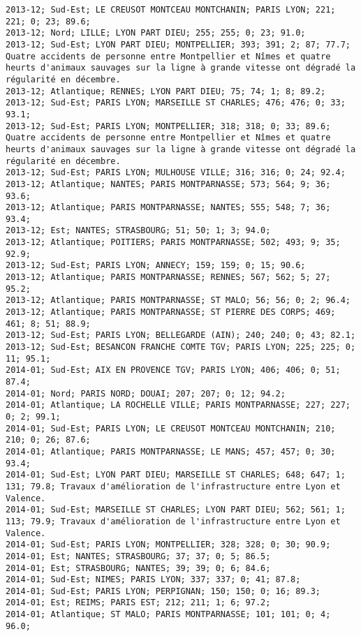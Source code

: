 \documentclass{article}
\begin{document}
\begin{Verbatim}[commandchars=\\\{\}]
2013-12; Sud-Est; LE CREUSOT MONTCEAU MONTCHANIN; PARIS LYON; 221; 221; 0; 23; 89.6; 
2013-12; Nord; LILLE; LYON PART DIEU; 255; 255; 0; 23; 91.0; 
2013-12; Sud-Est; LYON PART DIEU; MONTPELLIER; 393; 391; 2; 87; 77.7; Quatre accidents de personne entre Montpellier et Nîmes et quatre heurts d'animaux sauvages sur la ligne à grande vitesse ont dégradé la régularité en décembre.
2013-12; Atlantique; RENNES; LYON PART DIEU; 75; 74; 1; 8; 89.2; 
2013-12; Sud-Est; PARIS LYON; MARSEILLE ST CHARLES; 476; 476; 0; 33; 93.1; 
2013-12; Sud-Est; PARIS LYON; MONTPELLIER; 318; 318; 0; 33; 89.6; Quatre accidents de personne entre Montpellier et Nîmes et quatre heurts d'animaux sauvages sur la ligne à grande vitesse ont dégradé la régularité en décembre.
2013-12; Sud-Est; PARIS LYON; MULHOUSE VILLE; 316; 316; 0; 24; 92.4; 
2013-12; Atlantique; NANTES; PARIS MONTPARNASSE; 573; 564; 9; 36; 93.6; 
2013-12; Atlantique; PARIS MONTPARNASSE; NANTES; 555; 548; 7; 36; 93.4; 
2013-12; Est; NANTES; STRASBOURG; 51; 50; 1; 3; 94.0; 
2013-12; Atlantique; POITIERS; PARIS MONTPARNASSE; 502; 493; 9; 35; 92.9; 
2013-12; Sud-Est; PARIS LYON; ANNECY; 159; 159; 0; 15; 90.6; 
2013-12; Atlantique; PARIS MONTPARNASSE; RENNES; 567; 562; 5; 27; 95.2; 
2013-12; Atlantique; PARIS MONTPARNASSE; ST MALO; 56; 56; 0; 2; 96.4; 
2013-12; Atlantique; PARIS MONTPARNASSE; ST PIERRE DES CORPS; 469; 461; 8; 51; 88.9; 
2013-12; Sud-Est; PARIS LYON; BELLEGARDE (AIN); 240; 240; 0; 43; 82.1; 
2013-12; Sud-Est; BESANCON FRANCHE COMTE TGV; PARIS LYON; 225; 225; 0; 11; 95.1; 
2014-01; Sud-Est; AIX EN PROVENCE TGV; PARIS LYON; 406; 406; 0; 51; 87.4; 
2014-01; Nord; PARIS NORD; DOUAI; 207; 207; 0; 12; 94.2; 
2014-01; Atlantique; LA ROCHELLE VILLE; PARIS MONTPARNASSE; 227; 227; 0; 2; 99.1; 
2014-01; Sud-Est; PARIS LYON; LE CREUSOT MONTCEAU MONTCHANIN; 210; 210; 0; 26; 87.6; 
2014-01; Atlantique; PARIS MONTPARNASSE; LE MANS; 457; 457; 0; 30; 93.4; 
2014-01; Sud-Est; LYON PART DIEU; MARSEILLE ST CHARLES; 648; 647; 1; 131; 79.8; Travaux d'amélioration de l'infrastructure entre Lyon et Valence.
2014-01; Sud-Est; MARSEILLE ST CHARLES; LYON PART DIEU; 562; 561; 1; 113; 79.9; Travaux d'amélioration de l'infrastructure entre Lyon et Valence.
2014-01; Sud-Est; PARIS LYON; MONTPELLIER; 328; 328; 0; 30; 90.9; 
2014-01; Est; NANTES; STRASBOURG; 37; 37; 0; 5; 86.5; 
2014-01; Est; STRASBOURG; NANTES; 39; 39; 0; 6; 84.6; 
2014-01; Sud-Est; NIMES; PARIS LYON; 337; 337; 0; 41; 87.8; 
2014-01; Sud-Est; PARIS LYON; PERPIGNAN; 150; 150; 0; 16; 89.3; 
2014-01; Est; REIMS; PARIS EST; 212; 211; 1; 6; 97.2; 
2014-01; Atlantique; ST MALO; PARIS MONTPARNASSE; 101; 101; 0; 4; 96.0; 

\end{Verbatim}
\end{document}
